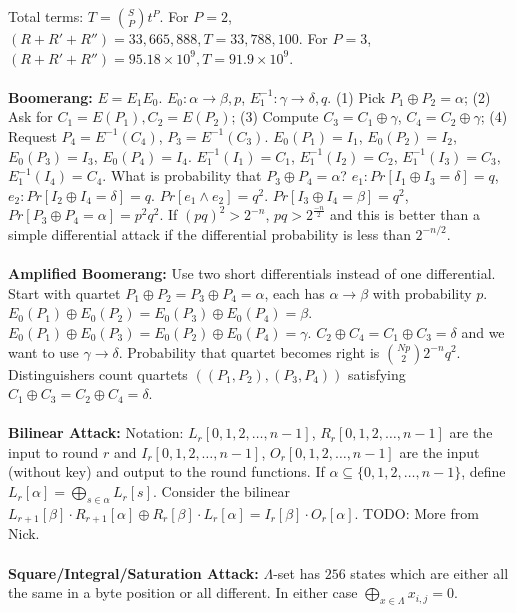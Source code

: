 Total terms: $T= {S \choose P} t^P$.  
For $P=2$, $(R+R'+R'')= 33,665,888, T= 33,788,100$.
For $P=3$, $(R+R'+R'')= 95.18 \times 10^9, T= 91.9 \times 10^9$.
\\
\\
{\bf Boomerang:} $E=E_1 E_0$.
$E_0: \alpha \rightarrow \beta, p$,
$E_1^{-1}: \gamma \rightarrow \delta, q$.  (1) Pick $P_1 \oplus P_2= \alpha$;
(2) Ask for $C_1= E(P_1), C_2= E(P_2)$;
(3) Compute $C_3= C_1 \oplus \gamma$, $C_4= C_2 \oplus \gamma$;
(4) Request $P_4= E^{-1}(C_4)$, $P_3= E^{-1}(C_3)$.
$E_0(P_1)=I_1$, $E_0(P_2)=I_2$, $E_0(P_3)=I_3$, $E_0(P_4)=I_4$.  $E_1^{-1}(I_1)= C_1$,
$E_1^{-1}(I_2)=C_2$, $E_1^{-1}(I_3)=C_3$, $E_1^{-1}(I_4)=C_4$.
What is probability that $P_3 \oplus P_4 = \alpha$?
$e_1: Pr[I_1 \oplus I_3 = \delta]= q$, $e_2: Pr[I_2 \oplus I_4= \delta]= q$.  
$Pr[ e_1 \wedge e_2 ]= q^2$.
$Pr[I_3 \oplus I_4 = \beta]= q^2$,
$Pr[P_3 \oplus P_4 = \alpha]= p^2q^2$.  If $(pq)^2>2^{-n}$, $pq>2^{\frac {-n} 2}$
and this is better than a simple differential attack if the differential probability
is less than $2^{-n/2}$.
\\
\\
{\bf Amplified Boomerang:}
Use two short differentials instead of one differential.  Start with quartet
$P_1 \oplus P_2 = P_3 \oplus P_4= \alpha$, 
each has $\alpha \rightarrow \beta$
with probability $p$.
$E_0(P_1) \oplus E_0(P_2) = E_0(P_3) \oplus E_0(P_4)= \beta$. 
$E_0(P_1) \oplus E_0(P_3) = E_0(P_2) \oplus E_0(P_4)= \gamma$. 
$C_2 \oplus C_4 = C_1 \oplus C_3= \delta$ and we want to use
$\gamma \rightarrow \delta$.  Probability that quartet becomes
right is ${{Np} \choose 2} 2^{-n} q^2$.  Distinguishers count quartets
$((P_1, P_2), (P_3, P_4))$ satisfying 
$C_1 \oplus C_3 = C_2 \oplus C_4 = \delta$.
\\
\\
{\bf Bilinear Attack:}
Notation: $L_r[0, 1, 2, \ldots, n-1]$, $R_r[0, 1, 2, \ldots, n-1]$ are the input
to round $r$ and 
$I_r[0, 1, 2, \ldots, n-1]$, $O_r[0, 1, 2, \ldots, n-1]$ are the input (without key)
and output to the round functions.  If $\alpha \subseteq \{0, 1, 2, \ldots, n-1\}$,
define $L_r[\alpha]= \bigoplus_{s \in \alpha} L_r[s]$.  Consider the bilinear
$L_{r+1}[\beta] \cdot R_{r+1}[\alpha] \oplus
R_{r}[\beta] \cdot L_{r}[\alpha] = I_{r}[\beta] \cdot O_{r}[\alpha]$.
TODO: More from Nick.
\\
\\
{\bf Square/Integral/Saturation Attack:} 
$\Lambda$-set has $256$ states which are either all the same in a byte position or
all different.  In either case $\bigoplus_{x \in \Lambda} x_{i,j} = 0$.  
